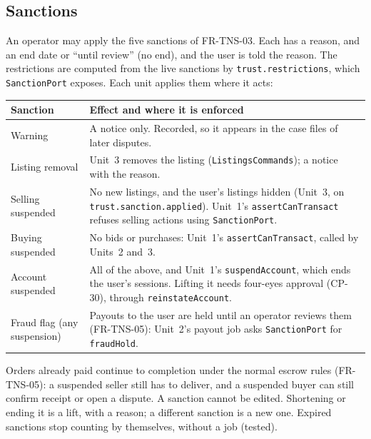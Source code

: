 \documentclass[11pt,a4paper]{article}
\newenvironment{dtable}[1]{\small\begin{longtable}{#1}}{\end{longtable}}
\begin{document}
\subsection{Sanctions}
\label{sec:sanctions}
An operator may apply the five sanctions of FR-TNS-03. Each has a reason, and an end date or ``until review'' (no end), and the user is told the reason. The restrictions are computed from the live sanctions by \texttt{trust.restrictions}, which \texttt{SanctionPort} exposes. Each unit applies them where it acts:
\begin{dtable}{@{}>{\raggedright\arraybackslash}p{3.3cm}>{\raggedright\arraybackslash}p{11.9cm}@{}}
\toprule
\textbf{Sanction} & \textbf{Effect and where it is enforced} \\ \midrule \endhead
Warning & A notice only. Recorded, so it appears in the case files of later disputes. \\
Listing removal & Unit~3 removes the listing (\texttt{ListingsCommands}); a notice with the reason. \\
Selling suspended & No new listings, and the user's listings hidden (Unit~3, on \texttt{trust.sanction.applied}). Unit~1's \texttt{assertCanTransact} refuses selling actions using \texttt{SanctionPort}. \\
Buying suspended & No bids or purchases: Unit~1's \texttt{assertCanTransact}, called by Units~2 and~3. \\
Account suspended & All of the above, and Unit~1's \texttt{suspendAccount}, which ends the user's sessions. Lifting it needs four-eyes approval (CP-30), through \texttt{reinstateAccount}. \\
Fraud flag (any suspension) & Payouts to the user are held until an operator reviews them (FR-TNS-05): Unit~2's payout job asks \texttt{SanctionPort} for \texttt{fraudHold}. \\
\bottomrule
\end{dtable}
Orders already paid continue to completion under the normal escrow rules (FR-TNS-05): a suspended seller still has to deliver, and a suspended buyer can still confirm receipt or open a dispute. A sanction cannot be edited. Shortening or ending it is a lift, with a reason; a different sanction is a new one. Expired sanctions stop counting by themselves, without a job (tested).
\end{document}
